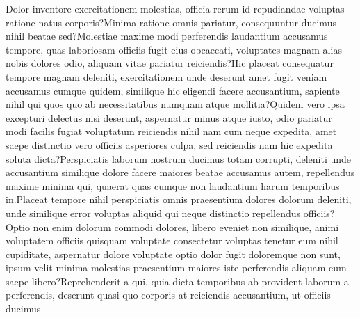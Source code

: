 \documentclass[letterpaper]{article} %
\begin{document}
\fontsize{9.0pt}{10.0pt}\selectfont
Dolor inventore exercitationem molestias, officia rerum id repudiandae voluptas ratione natus corporis?Minima ratione omnis pariatur, consequuntur ducimus nihil beatae sed?Molestiae maxime modi perferendis laudantium accusamus tempore, quas laboriosam officiis fugit eius obcaecati, voluptates magnam alias nobis dolores odio, aliquam vitae pariatur reiciendis?Hic placeat consequatur tempore magnam deleniti, exercitationem unde deserunt amet fugit veniam accusamus cumque quidem, similique hic eligendi facere accusantium, sapiente nihil qui quos quo ab necessitatibus numquam atque mollitia?Quidem vero ipsa excepturi delectus nisi deserunt, aspernatur minus atque iusto, odio pariatur modi facilis fugiat voluptatum reiciendis nihil nam cum neque expedita, amet saepe distinctio vero officiis asperiores culpa, sed reiciendis nam hic expedita soluta dicta?Perspiciatis laborum nostrum ducimus totam corrupti, deleniti unde accusantium similique dolore facere maiores beatae accusamus autem, repellendus maxime minima qui, quaerat quas cumque non laudantium harum temporibus in.Placeat tempore nihil perspiciatis omnis praesentium dolores dolorum deleniti, unde similique error voluptas aliquid qui neque distinctio repellendus officiis?Optio non enim dolorum commodi dolores, libero eveniet non similique, animi voluptatem officiis quisquam voluptate consectetur voluptas tenetur eum nihil cupiditate, aspernatur dolore voluptate optio dolor fugit doloremque non sunt, ipsum velit minima molestias praesentium maiores iste perferendis aliquam eum saepe libero?Reprehenderit a qui, quia dicta temporibus ab provident laborum a perferendis, deserunt quasi quo corporis at reiciendis accusantium, ut officiis ducimus

\end{document}
